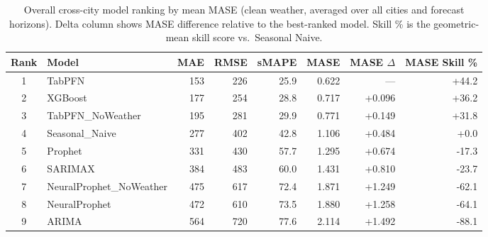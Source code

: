 \begin{table}[ht!]
\centering
\caption{Overall cross-city model ranking by mean MASE (clean weather, averaged over all cities and forecast horizons). Delta column shows MASE difference relative to the best-ranked model. Skill \% is the geometric-mean skill score vs.\ Seasonal Naive.}
\label{tab:cross_city_overall_ranking}
{\small\setlength{\tabcolsep}{4pt}\scriptsize
\begin{tabular}{clrrrrrr}
\toprule
Rank & Model & MAE & RMSE & sMAPE & MASE & MASE \(\Delta\) & MASE Skill \% \\
\midrule
1 & TabPFN & 153 & 226 & 25.9 & 0.622 & --- & +44.2 \\
2 & XGBoost & 177 & 254 & 28.8 & 0.717 & +0.096 & +36.2 \\
3 & TabPFN_NoWeather & 195 & 281 & 29.9 & 0.771 & +0.149 & +31.8 \\
4 & Seasonal_Naive & 277 & 402 & 42.8 & 1.106 & +0.484 & +0.0 \\
5 & Prophet & 331 & 430 & 57.7 & 1.295 & +0.674 & -17.3 \\
6 & SARIMAX & 384 & 483 & 60.0 & 1.431 & +0.810 & -23.7 \\
7 & NeuralProphet_NoWeather & 475 & 617 & 72.4 & 1.871 & +1.249 & -62.1 \\
8 & NeuralProphet & 472 & 610 & 73.5 & 1.880 & +1.258 & -64.1 \\
9 & ARIMA & 564 & 720 & 77.6 & 2.114 & +1.492 & -88.1 \\
\bottomrule
\end{tabular}
}
\end{table}

